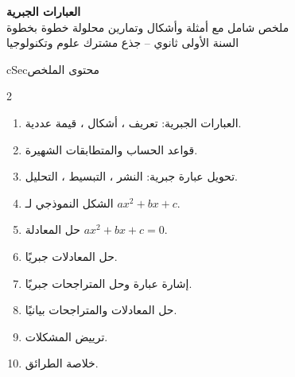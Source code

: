 \documentclass[12pt,a4paper]{article}
\newenvironment{BOX}[2]{\begin{otherlanguage}{english}\begin{arbox}{#1}{#2}}{\end{arbox}\end{otherlanguage}}
\newenvironment{LTR}{\begin{otherlanguage}{english}}{\end{otherlanguage}}
\begin{document}
\begin{LTR}
\begin{tcolorbox}[enhanced,colback=cSec!10,colframe=cSec!40,arc=3mm,halign=center,boxrule=0.6pt,top=12pt,bottom=12pt,before upper={\selectlanguage{arabic}}]
{\color{cSec}\fontsize{28}{34}\selectfont\bfseries العبارات الجبرية}\\[8pt]
{\color{cSec!80!black}\large ملخص شامل مع أمثلة وأشكال وتمارين محلولة خطوة بخطوة}\\[5pt]
{\color{cSec!80!black}\large السنة الأولى ثانوي -- جذع مشترك علوم وتكنولوجيا}
\end{tcolorbox}
\end{LTR}

\begin{BOX}{cSec}{محتوى الملخص}
\begin{multicols}{2}
\begin{enumerate}[label=\textbf{\arabic*.}]
\item العبارات الجبرية: تعريف ، أشكال ، قيمة عددية.
\item قواعد الحساب والمتطابقات الشهيرة.
\item تحويل عبارة جبرية: النشر ، التبسيط ، التحليل.
\item الشكل النموذجي لـ $ax^2+bx+c$.
\item حل المعادلة $ax^2+bx+c=0$.
\item حل المعادلات جبريًا.
\item إشارة عبارة وحل المتراجحات جبريًا.
\item حل المعادلات والمتراجحات بيانيًا.
\item ترييض المشكلات.
\item خلاصة الطرائق.
\end{enumerate}
\end{multicols}
\end{BOX}

\end{document}
